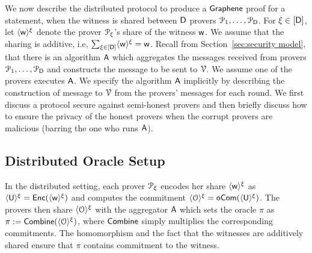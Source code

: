 We now describe the distributed protocol to produce a $\textsf{Graphene}$ proof for a
statement, when the witness is shared between $\mathsf{D}$ provers $\mathcal{P}_1,\ldots,\mathcal{P}_{\mathsf{D}}$. For $\xi\in [\mathsf{D}]$,
let $\langle{\mathsf{w}}\rangle^\xi$ denote the prover $\mathcal{P}_\xi$'s share of the witness $\mathsf{w}$.
We assume that the sharing is additive, i.e, $\sum_{\xi\in [\mathsf{D}]} \langle{\mathsf{w}}\rangle^\xi =
\mathsf{w}$. Recall from Section~\ref{sec:security model}, that there is an algorithm $\mathsf{A}$ 
which aggregates the messages received
from provers $\mathcal{P}_1,\ldots,\mathcal{P}_{\mathsf{D}}$ and constructs the message to be
sent to  $\mathcal{V}$. We assume one of the provers executes $\mathsf{A}$.
We specify the algorithm $\mathsf{A}$ implicitly by describing the construction
of message to $\mathcal{V}$ from the provers' messages for each round.
We first discuss a protocol secure against semi-honest provers and then 
briefly discuss how to ensure the privacy of the honest provers when the corrupt 
provers are malicious (barring the one who runs $\mathsf{A}$). 

\subsection{Distributed Oracle Setup} In the distributed setting, each prover
$\mathcal{P}_\xi$ encodes her share $\langle{\mathsf{w}}\rangle^\xi$ as $\langle{\mathsf{U}}\rangle^\xi=\mathsf{Enc}(\langle{\mathsf{w}}\rangle^\xi)$
and computes the commitment $\langle{\mathcal{O}}\rangle^\xi=\mathsf{oCom}(\langle{\mathsf{U}}\rangle^\xi)$. The provers
then share $\langle{\mathcal{O}}\rangle^\xi$ with the aggregator $\mathsf{A}$ which sets the oracle
$\pi$ as $\pi := \mathsf{Combine}(\langle{\mathcal{O}}\rangle^\xi)$, where $\mathsf{Combine}$ simply multiplies the corresponding commitments. The homomorphism and the fact that the witnesses are additively shared ensure that $\pi$ contains commitment to the witness.


